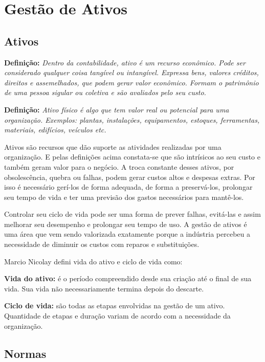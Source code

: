 \chapter{Gestão de Ativos}
\label{cap-ativos}

\section{Ativos}

\textbf{Definição:} \emph{Dentro da contabilidade, ativo é um recurso econômico. Pode ser considerado qualquer coisa tangível ou intangível. Expressa bens, valores créditos, direitos e assemelhados, que podem gerar valor econômico. Formam o patrimônio de uma pessoa sigular ou coletiva e são avaliados pelo seu custo.} \cite{sullivan2003}\cite{fulgencio2007} 

\textbf{Definição:} \emph{Ativo físico é algo que tem valor real ou potencial para uma organização.
Exemplos: plantas, instalações, equipamentos, estoques, ferramentas, materiais, edifícios, veículos etc.} \cite{nicolay2015}

Ativos são recursos que dão suporte as atividades realizadas por uma organização. E pelas definições acima constata-se que são intrísicos ao seu custo e também geram valor para o negócio. A troca constante desses ativos, por obsolescência, quebra ou falhas, podem gerar custos altos e despesas extras. Por isso é necessário gerí-los de forma adequada, de forma a preservá-los, prolongar seu tempo de vida e ter uma previsão dos gastos necessários para mantê-los. 

Controlar seu ciclo de vida pode ser uma forma de prever falhas, evitá-las e assim melhorar seu desempenho e prolongar seu tempo de uso. A gestão de ativos é uma área que vem sendo valorizada exatamente porque a indústria percebeu a necessidade de diminuir os custos com reparos e substituições.

Marcio Nicolay \cite{nicolay2015} defini vida do ativo e ciclo de vida como:

\textbf{Vida do ativo:} é o período compreendido desde sua criação até o final de sua vida. Sua vida não necessariamente termina depois do descarte.

\textbf{Ciclo de vida:} são todas as etapas envolvidas na gestão de um ativo. Quantidade de etapas e duração variam de acordo com a necessidade da organização.


\section{Normas}

